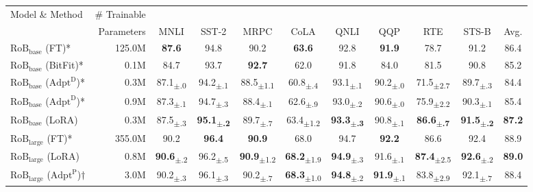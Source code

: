 \begin{table}[t!]
  \centering
  \footnotesize
  \addtolength{\tabcolsep}{-4pt}
  \begin{tabular}{l|r|ccccccccc}
  \hline
  \toprule
  Model \& Method & \# Trainable & \multicolumn{9}{c}{} \\
         & Parameters & MNLI & SST-2 & MRPC & CoLA & QNLI & QQP & RTE & STS-B & Avg. \\
  \midrule
  $\text{RoB}_\text{base}$ (FT)* & 125.0M & \textbf{87.6} & 94.8 & 90.2 & \textbf{63.6} & 92.8 & \textbf{91.9} & 78.7 & 91.2 & 86.4 \\
  $\text{RoB}_\text{base}$ (BitFit)* & 0.1M & 84.7 & 93.7 & \textbf{92.7} & 62.0 & 91.8 & 84.0 & 81.5 & 90.8 & 85.2 \\
  $\text{RoB}_\text{base}$ ($\text{Adpt}^{\text{D}}$)* & 0.3M & 87.1\textsubscript{$\pm$.0} & 94.2\textsubscript{$\pm$.1} & 88.5\textsubscript{$\pm$1.1} & 60.8\textsubscript{$\pm$.4} & 93.1\textsubscript{$\pm$.1} & 90.2\textsubscript{$\pm$.0} & 71.5\textsubscript{$\pm$2.7} & 89.7\textsubscript{$\pm$.3} & 84.4 \\
  $\text{RoB}_\text{base}$ ($\text{Adpt}^{\text{D}}$)* & 0.9M & 87.3\textsubscript{$\pm$.1} & 94.7\textsubscript{$\pm$.3} & 88.4\textsubscript{$\pm$.1} & 62.6\textsubscript{$\pm$.9} & 93.0\textsubscript{$\pm$.2} & 90.6\textsubscript{$\pm$.0} & 75.9\textsubscript{$\pm$2.2} & 90.3\textsubscript{$\pm$.1} & 85.4 \\
  $\text{RoB}_\text{base}$ (LoRA) & 0.3M & 87.5\textsubscript{$\pm$.3} & \textbf{95.1\textsubscript{$\pm$.2}} & 89.7\textsubscript{$\pm$.7} & 63.4\textsubscript{$\pm$1.2} & \textbf{93.3\textsubscript{$\pm$.3}} & 90.8\textsubscript{$\pm$.1} & \textbf{86.6\textsubscript{$\pm$.7}} & \textbf{91.5\textsubscript{$\pm$.2}} & \textbf{87.2} \\
  \midrule
  $\text{RoB}_\text{large}$ (FT)* & 355.0M & 90.2 & \textbf{96.4} & \textbf{90.9} & 68.0 & 94.7 & \textbf{92.2} & 86.6 & 92.4 & 88.9 \\
  $\text{RoB}_\text{large}$ (LoRA) & 0.8M & \textbf{90.6}\textsubscript{$\pm$.2} & 96.2\textsubscript{$\pm$.5} & \textbf{90.9}\textsubscript{$\pm$1.2} & \textbf{68.2}\textsubscript{$\pm$1.9} & \textbf{94.9}\textsubscript{$\pm$.3} & 91.6\textsubscript{$\pm$.1} & \textbf{87.4}\textsubscript{$\pm$2.5} & \textbf{92.6}\textsubscript{$\pm$.2} & \textbf{89.0} \\
  \midrule
  $\text{RoB}_\text{large}$ ($\text{Adpt}^{\text{P}}$)$\dagger$ & 3.0M & 90.2\textsubscript{$\pm$.3} & 96.1\textsubscript{$\pm$.3} & 90.2\textsubscript{$\pm$.7} & \textbf{68.3}\textsubscript{$\pm$1.0} & \textbf{94.8}\textsubscript{$\pm$.2} & \textbf{91.9}\textsubscript{$\pm$.1} & 83.8\textsubscript{$\pm$2.9} & 92.1\textsubscript{$\pm$.7} & 88.4 \\

\end{tabular}
\end{table}
